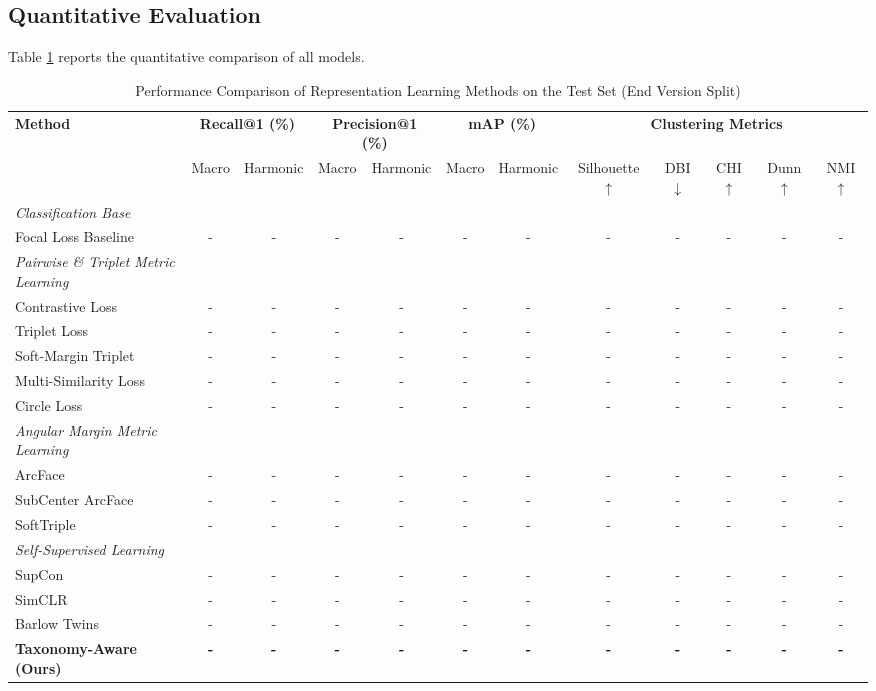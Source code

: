 \documentclass[journal,onecolumn]{IEEEtran}
\begin{document}
\subsection{Quantitative Evaluation}
Table \ref{tab:main_results} reports the quantitative comparison of all models.

\begin{table}[htbp]
\centering
\caption{Performance Comparison of Representation Learning Methods on the Test Set (End Version Split)}
\label{tab:main_results}
\begin{tabular}{lccccccccccc}
\toprule
\multirow{2}{*}{\textbf{Method}} & \multicolumn{2}{c}{\textbf{Recall@1 (\%)}} & \multicolumn{2}{c}{\textbf{Precision@1 (\%)}} & \multicolumn{2}{c}{\textbf{mAP (\%)}} & \multicolumn{5}{c}{\textbf{Clustering Metrics}} \\
\cmidrule(lr){2-3} \cmidrule(lr){4-5} \cmidrule(lr){6-7} \cmidrule(lr){8-12}
& Macro & Harmonic & Macro & Harmonic & Macro & Harmonic & Silhouette $\uparrow$ & DBI $\downarrow$ & CHI $\uparrow$ & Dunn $\uparrow$ & NMI $\uparrow$ \\
\midrule
\textit{Classification Base} \\
Focal Loss Baseline & - & - & - & - & - & - & - & - & - & - & - \\
\midrule
\textit{Pairwise \& Triplet Metric Learning} \\
Contrastive Loss & - & - & - & - & - & - & - & - & - & - & - \\
Triplet Loss & - & - & - & - & - & - & - & - & - & - & - \\
Soft-Margin Triplet & - & - & - & - & - & - & - & - & - & - & - \\
Multi-Similarity Loss & - & - & - & - & - & - & - & - & - & - & - \\
Circle Loss & - & - & - & - & - & - & - & - & - & - & - \\
\midrule
\textit{Angular Margin Metric Learning} \\
ArcFace & - & - & - & - & - & - & - & - & - & - & - \\
SubCenter ArcFace & - & - & - & - & - & - & - & - & - & - & - \\
SoftTriple & - & - & - & - & - & - & - & - & - & - & - \\
\midrule
\textit{Self-Supervised Learning} \\
SupCon & - & - & - & - & - & - & - & - & - & - & - \\
SimCLR & - & - & - & - & - & - & - & - & - & - & - \\
Barlow Twins & - & - & - & - & - & - & - & - & - & - & - \\
\midrule
\textbf{Taxonomy-Aware (Ours)} & \textbf{-} & \textbf{-} & \textbf{-} & \textbf{-} & \textbf{-} & \textbf{-} & \textbf{-} & \textbf{-} & \textbf{-} & \textbf{-} & \textbf{-} \\
\bottomrule
\end{tabular}
\end{table}
\end{document}
